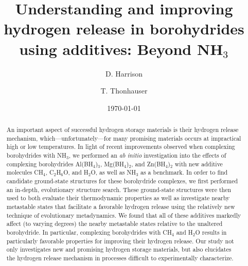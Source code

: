 \documentclass[twocolumn, prb, showpacs]{revtex4-1}
\begin{document}





\title{Understanding and improving hydrogen release in borohydrides
using additives: Beyond NH$_3$}


\author{D. Harrison}


\author{T. Thonhauser}

\date{\today}


\begin{abstract}
An important aspect of successful hydrogen storage materials is their
hydrogen release mechanism, which---unfortunately---for many promising
materials occurs at impractical high or low temperatures.
In light of recent improvements observed when complexing borohydrides with NH$_3$, 
we performed an \emph{ab initio} investigation into the effects of complexing borohydrides
Al(BH$_4$)$_3$, Mg(BH$_4$)$_2$, and Zn(BH$_4$)$_2$ with new additive molecules CH$_4$, C$_2$H$_6$O,
and H$_2$O, as well as NH$_3$ as a benchmark. In order to find
candidate ground-state structures for these borohydride complexes,
we first performed an in-depth, evolutionary structure search.
These ground-state structures were then used to both evaluate their thermodynamic properties 
as well as investigate nearby metastable states that facilitate a favorable hydrogen release using the relatively new technique of
evolutionary metadynamics. We found that all of these additives markedly affect
(to varying degrees) the nearby metastable states relative to the unaltered
borohydride. In particular, complexing borohydrides with CH$_4$ and H$_2$O
results in particularly favorable properties for improving their hydrogen release.
Our study not only investigates new and promising hydrogen storage
materials, but also elucidates the hydrogen release mechanism in
processes difficult to experimentally characterize.
\end{abstract}


\end{document}
